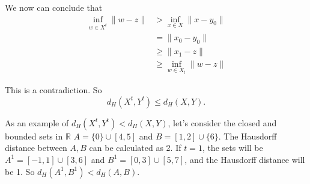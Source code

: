 \documentclass{article}
\begin{document}
    We now can conclude that
    \begin{align*}
        \inf_{w \in X^t} \lVert w - z \lVert &> \inf_{x \in X} \lVert x - y_0 \lVert \\
        &= \lVert x_0 - y_0 \lVert \\
        &\ge \lVert x_1 - z \lVert \\
        &\ge \inf_{w \in X_t} \lVert w - z \lVert
    \end{align*}

    This is a contradiction.
    So \[d_H(X^t, Y^t) \le d_H(X, Y).\]

    As an example of $d_H(X^t, Y^t) < d_H(X, Y)$, let's consider the closed and bounded sets in $\mathbb{R}$ $A = \{0\} \cup [4, 5]$ and $B = [1, 2] \cup \{6\}$. The Hausdorff distance between $A, B$ can be calculated as 2.
    If $t = 1$, the sets will be $A^1 = [-1, 1] \cup [3, 6]$ and $B^1 = [0, 3] \cup [5, 7]$, and the Hausdorff distance will be 1.
    So
    $d_H(A^1, B^1) < d_H(A, B)$.
\end{document}
